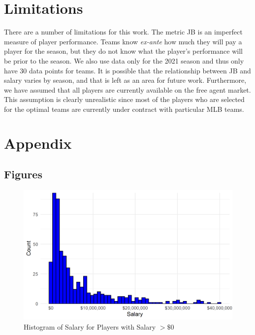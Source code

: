 \documentclass{article}
\begin{document}
\section{Limitations}

There are a number of limitations for this work. The metric JB is an imperfect measure of player performance. Teams know \emph{ex-ante} how much they will pay a player for the season, but they do not know what the player's performance will be prior to the season. We also use data only for the 2021 season and thus only have 30 data points for teams. It is possible that the relationship between JB and salary varies by season, and that is left as an area for future work. Furthermore, we have assumed that all players are currently available on the free agent market. This assumption is clearly unrealistic since most of the players who are selected for the optimal teams are currently under contract with particular MLB teams. 

\newpage




\newpage

\section{Appendix}

\subsection{Figures}

\begin{figure}[h]
\caption{Histogram of Salary for Players with Salary $> \$0$}
\label{fig:salary_hist}
\centering
\includegraphics[width=0.7\paperwidth, scale=1.25]{salary_hist.png}
\end{figure}
\end{document}
